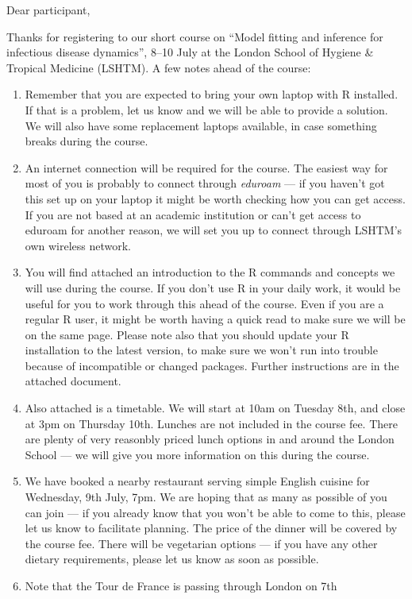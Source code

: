\documentclass[paper=a4, 11pt]{scrlttr2}
\begin{document}
\begin{letter}{}
\opening{Dear participant,}
Thanks for registering to our short course on ``Model fitting and
inference for infectious disease dynamics'', 8--10 July at the London
School of Hygiene \& Tropical Medicine (LSHTM). A few notes ahead of
the course:

\begin{enumerate}
\item Remember that you are expected to bring your own laptop with R
installed. If that is a problem, let us know and we will be able to
provide a solution. We will also have some replacement laptops
available, in case something breaks during the course.
\item An internet connection will be required for the course. The easiest
way for most of you is probably to connect through \emph{eduroam} --- if you
haven't got this set up on your laptop it might be worth checking how you
can get access. If you are not based at an academic institution or can't
get access to eduroam for another reason, we will set you up to connect
through LSHTM's own wireless network.
\item You will find attached an introduction to the R commands and concepts
we will use during the course. If you don't use R in your daily work, it
would be useful for you to work through this ahead of the course. Even
if you are a regular R user, it might be worth having a quick read to
make sure we will be on the same page. Please note also that you should
update your R installation to the latest version, to make sure we won't
run into trouble because of incompatible or changed packages. Further
instructions are in the attached document.
\item Also attached is a timetable. We will start at 10am on Tuesday 8th,
and close at 3pm on Thursday 10th. Lunches are not included in the
course fee. There are plenty of very reasonbly priced lunch options in
and around the London School --- we will give you more information on
this during the course.
\item We have booked a nearby restaurant serving simple English cuisine for
Wednesday, 9th July, 7pm. We are hoping that as many as possible of you
can join --- if you already know that you won't be able to come to this,
please let us know to facilitate planning. The price of the dinner will
be covered by the course fee. There will be vegetarian options --- if you
have any other dietary requirements, please let us know as soon as
possible.
\item Note that the Tour de France is passing through London on 7th

\end{enumerate}
\end{letter}
\end{document}
